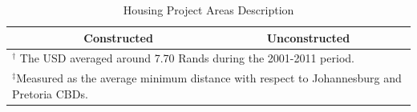 \documentclass[12pt]{article}
\begin{document}

\vspace{0mm}
\begin{table}[h!]
\centering
\caption{Housing Project Areas Description}\label{table:projectdescriptives}
\vspace{0mm}
\begin{tabular}{l*{1}{cc}}
\toprule
  &Constructed & Unconstructed \\
\midrule

\bottomrule
\multicolumn{3}{l}{\scriptsize $^\dagger$ The USD averaged around 7.70 Rands during the 2001-2011 period.}\\[-.5em]
\multicolumn{3}{l}{\scriptsize $^\ddagger$Measured as the average minimum distance with respect to Johannesburg and Pretoria CBDs. } \\[-.5em]
\end{tabular}
\end{table} 
\end{document}
